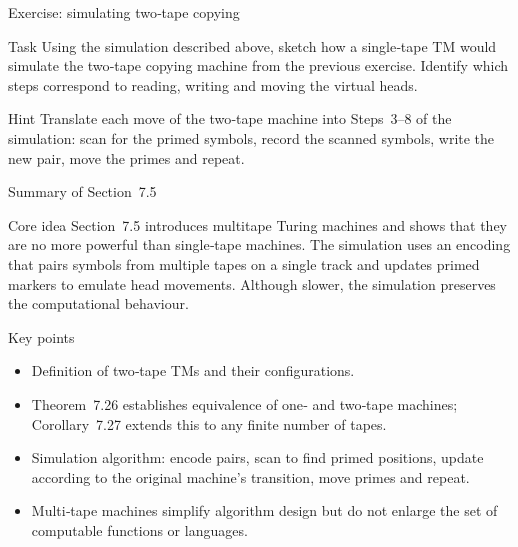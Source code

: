 \begin{frame}[t]{Exercise: simulating two‑tape copying}
  \begin{tblock}{Task}
    Using the simulation described above, sketch how a single‑tape TM
    would simulate the two‑tape copying machine from the previous
    exercise.  Identify which steps correspond to reading, writing and
    moving the virtual heads.
  \end{tblock}
  \begin{talert}{Hint}
    Translate each move of the two‑tape machine into Steps 3–8 of the
    simulation: scan for the primed symbols, record the scanned
    symbols, write the new pair, move the primes and repeat.
  \end{talert}
  \label{fr:7.5-12}
\end{frame}

\begin{frame}[t]{Summary of Section 7.5}
  \begin{tblock}{Core idea}
    Section 7.5 introduces multitape Turing machines and shows that
    they are no more powerful than single‑tape machines.  The
    simulation uses an encoding that pairs symbols from multiple tapes
    on a single track and updates primed markers to emulate head
    movements.  Although slower, the simulation preserves the
    computational behaviour.
  \end{tblock}
  \begin{tblock}{Key points}
    \begin{itemize}
      \item Definition of two‑tape TMs and their configurations.
      \item Theorem 7.26 establishes equivalence of one‑ and two‑tape
        machines; Corollary 7.27 extends this to any finite number of
        tapes.
      \item Simulation algorithm: encode pairs, scan to find primed
        positions, update according to the original machine’s
        transition, move primes and repeat.
      \item Multi‑tape machines simplify algorithm design but do not
        enlarge the set of computable functions or languages.
    \end{itemize}
  \end{tblock}
  \label{fr:7.5-13}
\end{frame}

